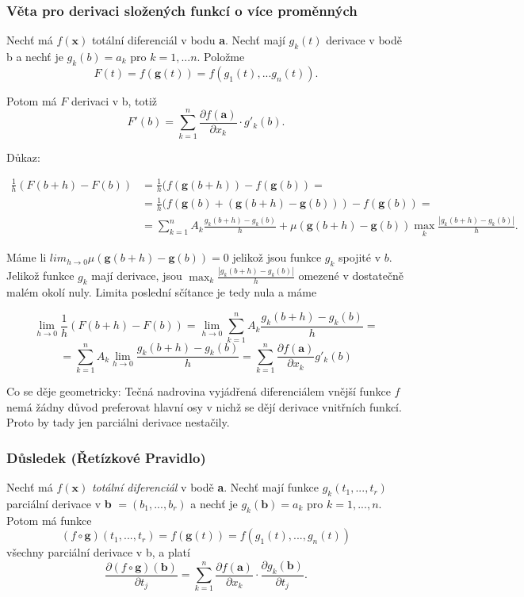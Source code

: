 \documentclass[10pt]{article}
\begin{document}
\subsubsection{Věta pro derivaci složených funkcí o více proměnných}
\hspace{1.2mm}
Nechť má $f(\textbf{x})$ totální diferenciál v bodu \textbf{a}. Nechť mají $g_k(t)$ derivace v bodě b a nechť je $g_k(b) = a_k$ pro 
$k = 1,...n.$ Položme
\[F(t) = f(\textbf{g}(t)) = f(g_1(t),...g_n(t)).\]

Potom má $F$ derivaci v b, totiž 
\[F'(b) = \sum^n_{k=1}\frac{\partial f(\textbf{a})}{\partial x_k} \cdot g'_k(b).\]

Důkaz:

\begin{align*} 
 \frac{1}{h} (F(b+h) - F(b)) &= \frac{1}{h}(f(\textbf{g}(b+h)) - f(\textbf{g}(b)) =  \\
 &=\frac{1}{h}(f(\textbf{g}(b) + (\textbf{g}(b+h) - \textbf{g}(b))) - f(\textbf{g}(b)) = \\
 &=\sum^n_{k=1}A_k\frac{g_k(b+h)-g_k(b)}{h} + \mu(\textbf{g}(b+h) - \textbf{g}(b)) \max_k\frac{|g_k(b+h)-g_k(b)|}{h}.
\end{align*}

Máme li $lim_{h \rightarrow 0} \mu(\textbf{g}(b+h)-\textbf{g}(b)) = 0$ jelikož jsou funkce $g_k$ spojité v $b$. 
Jelikož funkce $g_k$ mají derivace, jsou $\max_k \frac{|g_k(b+h) - g_k(b)|}{h}$ omezené v dostatečně malém okolí nuly. Limita 
poslední sčítance je tedy nula a máme

\[\lim_{h \rightarrow 0} \frac{1}{h}(F(b+h) - F(b)) = \lim_{h \rightarrow 0} \sum^n_{k = 1} A_k\frac{g_k(b+h)-g_k(b)}{h} = \]
\[= \sum^n_{k = 1}A_k\lim_{h \rightarrow 0} \frac{g_k(b+h) - g_k(b)}{h} = \sum^n_{k = 1}\frac{\partial f(\textbf{a})}{\partial x_k}g'_k(b)\]

\hspace{1.2mm}
Co se děje geometricky: Tečná nadrovina vyjádřená diferenciálem vnější funkce $f$ nemá žádny důvod preferovat hlavní osy v nichž se 
dějí derivace vnitřních funkcí. Proto by tady jen parciálni derivace nestačily. 
\noindent

\subsubsection{Důsledek (Řetízkové Pravidlo)}
\hspace{1.2mm}
Nechť má $f(\textbf{x})$ \textit{totální diferenciál} v bodě \textbf{a}. Nechť mají funkce $g_k(t_1,...,t_r)$ parciální 
derivace v \textbf{b} $= (b_1,...,b_r)$ a nechť je $g_k(\textbf{b}) = a_k$ pro $k = 1,...,n.$ Potom má funkce
\[(f\circ \textbf{g})(t_1,...,t_r) = f(\textbf{g}(t)) = f(g_1(t),...,g_n(t))\]
všechny parciální derivace v b, a platí 
\[\frac{\partial (f \circ \textbf{g})(\textbf{b})}{\partial t_j} = \sum^n_{k=1}\frac{\partial f(\textbf{a})}{\partial x_k}
\cdot \frac{\partial g_k(\textbf{b})}{\partial t_j}.\]
\end{document}
